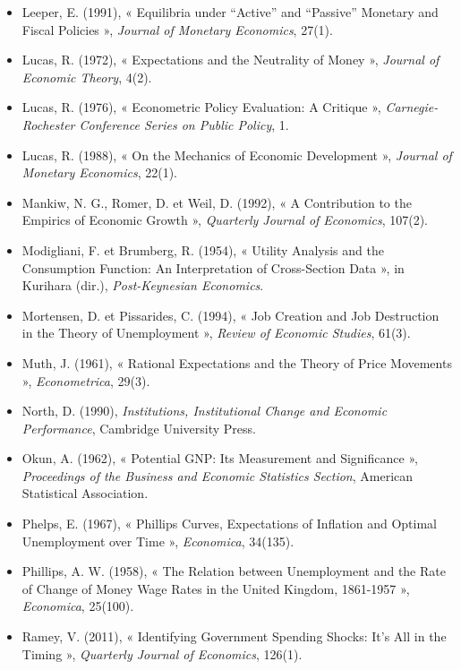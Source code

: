 \documentclass[
  11pt,
  11pt,
  a4paper,
  openany]{book}
\begin{document}
\begin{itemize}
  Le Barbanchon, T., Rathelot, R. et Roulet, A. (2019), « Unemployment
  Insurance and Reservation Wages: Evidence from Administrative Data »,
  \emph{Journal of Public Economics}, 171.
\item
  Leeper, E. (1991), « Equilibria under ``Active'' and ``Passive''
  Monetary and Fiscal Policies », \emph{Journal of Monetary Economics},
  27(1).
\item
  Lucas, R. (1972), « Expectations and the Neutrality of Money »,
  \emph{Journal of Economic Theory}, 4(2).
\item
  Lucas, R. (1976), « Econometric Policy Evaluation: A Critique »,
  \emph{Carnegie-Rochester Conference Series on Public Policy}, 1.
\item
  Lucas, R. (1988), « On the Mechanics of Economic Development »,
  \emph{Journal of Monetary Economics}, 22(1).
\item
  Mankiw, N. G., Romer, D. et Weil, D. (1992), « A Contribution to the
  Empirics of Economic Growth », \emph{Quarterly Journal of Economics},
  107(2).
\item
  Modigliani, F. et Brumberg, R. (1954), « Utility Analysis and the
  Consumption Function: An Interpretation of Cross-Section Data », in
  Kurihara (dir.), \emph{Post-Keynesian Economics}.
\item
  Mortensen, D. et Pissarides, C. (1994), « Job Creation and Job
  Destruction in the Theory of Unemployment », \emph{Review of Economic
  Studies}, 61(3).
\item
  Muth, J. (1961), « Rational Expectations and the Theory of Price
  Movements », \emph{Econometrica}, 29(3).
\item
  North, D. (1990), \emph{Institutions, Institutional Change and
  Economic Performance}, Cambridge University Press.
\item
  Okun, A. (1962), « Potential GNP: Its Measurement and Significance »,
  \emph{Proceedings of the Business and Economic Statistics Section},
  American Statistical Association.
\item
  Phelps, E. (1967), « Phillips Curves, Expectations of Inflation and
  Optimal Unemployment over Time », \emph{Economica}, 34(135).
\item
  Phillips, A. W. (1958), « The Relation between Unemployment and the
  Rate of Change of Money Wage Rates in the United Kingdom, 1861-1957 »,
  \emph{Economica}, 25(100).
\item
  Ramey, V. (2011), « Identifying Government Spending Shocks: It's All
  in the Timing », \emph{Quarterly Journal of Economics}, 126(1).

\end{itemize}
\end{document}
